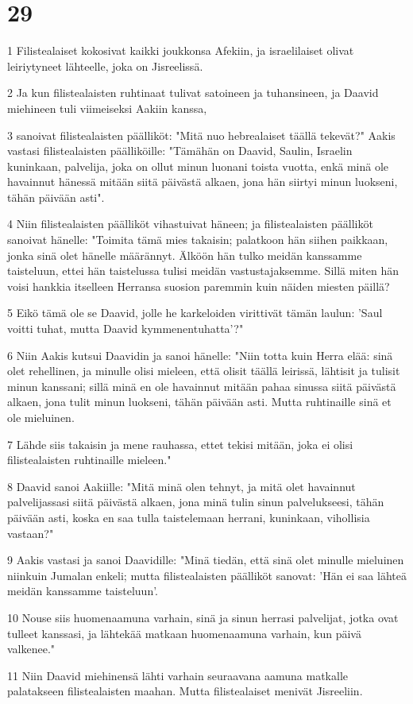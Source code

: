 \chapter{29}

\par 1 Filistealaiset kokosivat kaikki joukkonsa Afekiin, ja israelilaiset olivat leiriytyneet lähteelle, joka on Jisreelissä.
\par 2 Ja kun filistealaisten ruhtinaat tulivat satoineen ja tuhansineen, ja Daavid miehineen tuli viimeiseksi Aakiin kanssa,
\par 3 sanoivat filistealaisten päälliköt: "Mitä nuo hebrealaiset täällä tekevät?" Aakis vastasi filistealaisten päälliköille: "Tämähän on Daavid, Saulin, Israelin kuninkaan, palvelija, joka on ollut minun luonani toista vuotta, enkä minä ole havainnut hänessä mitään siitä päivästä alkaen, jona hän siirtyi minun luokseni, tähän päivään asti".
\par 4 Niin filistealaisten päälliköt vihastuivat häneen; ja filistealaisten päälliköt sanoivat hänelle: "Toimita tämä mies takaisin; palatkoon hän siihen paikkaan, jonka sinä olet hänelle määrännyt. Älköön hän tulko meidän kanssamme taisteluun, ettei hän taistelussa tulisi meidän vastustajaksemme. Sillä miten hän voisi hankkia itselleen Herransa suosion paremmin kuin näiden miesten päillä?
\par 5 Eikö tämä ole se Daavid, jolle he karkeloiden virittivät tämän laulun: 'Saul voitti tuhat, mutta Daavid kymmenentuhatta'?"
\par 6 Niin Aakis kutsui Daavidin ja sanoi hänelle: "Niin totta kuin Herra elää: sinä olet rehellinen, ja minulle olisi mieleen, että olisit täällä leirissä, lähtisit ja tulisit minun kanssani; sillä minä en ole havainnut mitään pahaa sinussa siitä päivästä alkaen, jona tulit minun luokseni, tähän päivään asti. Mutta ruhtinaille sinä et ole mieluinen.
\par 7 Lähde siis takaisin ja mene rauhassa, ettet tekisi mitään, joka ei olisi filistealaisten ruhtinaille mieleen."
\par 8 Daavid sanoi Aakiille: "Mitä minä olen tehnyt, ja mitä olet havainnut palvelijassasi siitä päivästä alkaen, jona minä tulin sinun palvelukseesi, tähän päivään asti, koska en saa tulla taistelemaan herrani, kuninkaan, vihollisia vastaan?"
\par 9 Aakis vastasi ja sanoi Daavidille: "Minä tiedän, että sinä olet minulle mieluinen niinkuin Jumalan enkeli; mutta filistealaisten päälliköt sanovat: 'Hän ei saa lähteä meidän kanssamme taisteluun'.
\par 10 Nouse siis huomenaamuna varhain, sinä ja sinun herrasi palvelijat, jotka ovat tulleet kanssasi, ja lähtekää matkaan huomenaamuna varhain, kun päivä valkenee."
\par 11 Niin Daavid miehinensä lähti varhain seuraavana aamuna matkalle palatakseen filistealaisten maahan. Mutta filistealaiset menivät Jisreeliin.

